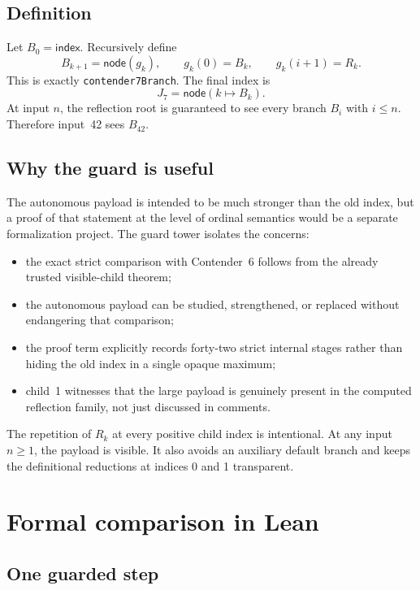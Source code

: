 \documentclass[11pt]{article}
\theoremstyle{definition}
\theoremstyle{remark}
\newcommand{\Index}{\ensuremath{\mathsf{index}}}
\newcommand{\lean}[1]{\texttt{#1}}
\begin{document}
\subsection{Definition}

Let $B_0=\Index$.  Recursively define
\[
  B_{k+1}=\mathsf{node}(g_k),\qquad
  g_k(0)=B_k,\qquad g_k(i+1)=R_k.
\]
This is exactly \lean{contender7Branch}.  The final index is
\[
  J_7=\mathsf{node}(k\mapsto B_k).
\]
At input $n$, the reflection root is guaranteed to see every branch $B_i$ with
$i\le n$.  Therefore input~42 sees $B_{42}$.

\subsection{Why the guard is useful}

The autonomous payload is intended to be much stronger than the old index, but
a proof of that statement at the level of ordinal semantics would be a separate
formalization project.  The guard tower isolates the concerns:

\begin{itemize}[leftmargin=*]
\item the exact strict comparison with Contender~6 follows from the already
  trusted visible-child theorem;
\item the autonomous payload can be studied, strengthened, or replaced without
  endangering that comparison;
\item the proof term explicitly records forty-two strict internal stages rather
  than hiding the old index in a single opaque maximum;
\item child~1 witnesses that the large payload is genuinely present in the
  computed reflection family, not just discussed in comments.
\end{itemize}

The repetition of $R_k$ at every positive child index is intentional.  At any
input $n\ge1$, the payload is visible.  It also avoids an auxiliary default
branch and keeps the definitional reductions at indices 0 and 1 transparent.

\section{Formal comparison in Lean}

\subsection{One guarded step}
\end{document}
